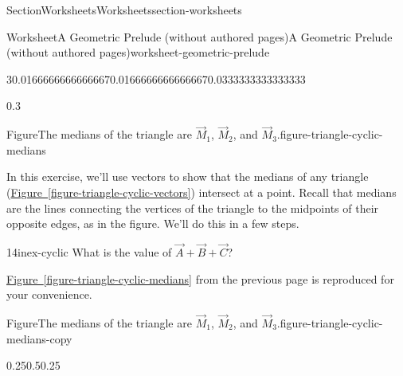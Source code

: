 \documentclass[twoside,10pt,]{article}
\newcommand{\xreffont}{\relax}
\numberwithin{equation}{section}
\begin{document}
\begin{sectionptx}{Section}{Worksheets}{}{Worksheets}{}{}{section-worksheets}
\begin{worksheet-subsection}{Worksheet}{A Geometric Prelude (without authored pages)}{}{A Geometric Prelude (without authored pages)}{}{}{worksheet-geometric-prelude}
\begin{introduction}{}
\begin{sidebyside}{3}{0.0166666666666667}{0.0166666666666667}{0.0333333333333333}
\begin{sbspanel}{0.3}
\begin{panelfigureptx}{Figure}{The medians of the triangle are \(\vec{M}_1\), \(\vec{M}_2\), and \(\vec{M}_3\).}{figure-triangle-cyclic-medians}{}
{%
}%
\tcblower
\end{panelfigureptx}%
\end{sbspanel}%
\end{sidebyside}%
\par
In this exercise, we'll use vectors to show that the medians of any triangle (\hyperref[figure-triangle-cyclic-vectors]{Figure~{\xreffont\ref{figure-triangle-cyclic-vectors}}}) intersect at a point. Recall that medians are the lines connecting the vertices of the triangle to the midpoints of their opposite edges, as in the figure. We'll do this in a few steps.%
\end{introduction}%
\begin{divisionexercise}{1}{}{4in}{ex-cyclic}%
What is the value of \(\vec{A} + \vec{B} + \vec{C}\)?%
\end{divisionexercise}%
\hyperref[figure-triangle-cyclic-medians]{Figure~{\xreffont\ref{figure-triangle-cyclic-medians}}} from the previous page is reproduced for your convenience.%
\begin{figureptx}{Figure}{The medians of the triangle are \(\vec{M}_1\), \(\vec{M}_2\), and \(\vec{M}_3\).}{figure-triangle-cyclic-medians-copy}{}%
\begin{image}{0.25}{0.5}{0.25}{}%
\end{image}
\end{figureptx}
\end{worksheet-subsection}
\end{sectionptx}
\end{document}
